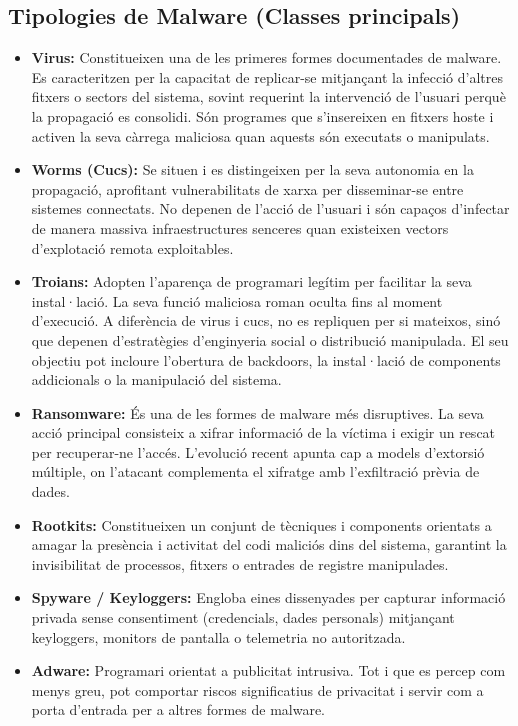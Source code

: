 \documentclass[12pt,a4paper]{report}
\begin{document}
\subsection{Tipologies de Malware (Classes principals)}
\begin{itemize}
    \item \textbf{Virus:} Constitueixen una de les primeres formes documentades de malware. Es caracteritzen per la capacitat de replicar-se mitjançant la infecció d'altres fitxers o sectors del sistema, sovint requerint la intervenció de l'usuari perquè la propagació es consolidi. Són programes que s'insereixen en fitxers hoste i activen la seva càrrega maliciosa quan aquests són executats o manipulats.
    \item \textbf{Worms (Cucs):} Se situen i es distingeixen per la seva autonomia en la propagació, aprofitant vulnerabilitats de xarxa per disseminar-se entre sistemes connectats. No depenen de l'acció de l'usuari i són capaços d'infectar de manera massiva infraestructures senceres quan existeixen vectors d'explotació remota exploitables.
    \item \textbf{Troians:} Adopten l'aparença de programari legítim per facilitar la seva instal·lació. La seva funció maliciosa roman oculta fins al moment d'execució. A diferència de virus i cucs, no es repliquen per si mateixos, sinó que depenen d'estratègies d'enginyeria social o distribució manipulada. El seu objectiu pot incloure l'obertura de backdoors, la instal·lació de components addicionals o la manipulació del sistema.
    \item \textbf{Ransomware:} És una de les formes de malware més disruptives. La seva acció principal consisteix a xifrar informació de la víctima i exigir un rescat per recuperar-ne l'accés. L'evolució recent apunta cap a models d'extorsió múltiple, on l'atacant complementa el xifratge amb l'exfiltració prèvia de dades.
    \item \textbf{Rootkits:} Constitueixen un conjunt de tècniques i components orientats a amagar la presència i activitat del codi maliciós dins del sistema, garantint la invisibilitat de processos, fitxers o entrades de registre manipulades.
    \item \textbf{Spyware / Keyloggers:} Engloba eines dissenyades per capturar informació privada sense consentiment (credencials, dades personals) mitjançant keyloggers, monitors de pantalla o telemetria no autoritzada.
    \item \textbf{Adware:} Programari orientat a publicitat intrusiva. Tot i que es percep com menys greu, pot comportar riscos significatius de privacitat i servir com a porta d'entrada per a altres formes de malware.
\end{itemize}
\end{document}
